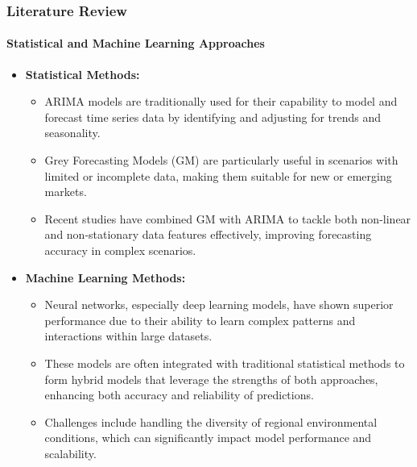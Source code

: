 \documentclass[light]{lutbeamer} %
\begin{document}
\begin{frame}
    \frametitle{Literature Review}
    \framesubtitle{Statistical and Machine Learning Approaches}
    \begin{itemize}
        \item \textbf{Statistical Methods:}
              \begin{itemize}
                  \item ARIMA models are traditionally used for their capability to model and forecast time series data by identifying and adjusting for trends and seasonality.
                  \item Grey Forecasting Models (GM) are particularly useful in scenarios with limited or incomplete data, making them suitable for new or emerging markets.
                  \item Recent studies have combined GM with ARIMA to tackle both non-linear and non-stationary data features effectively, improving forecasting accuracy in complex scenarios.
              \end{itemize}
        \item \textbf{Machine Learning Methods:}
              \begin{itemize}
                  \item Neural networks, especially deep learning models, have shown superior performance due to their ability to learn complex patterns and interactions within large datasets.
                  \item These models are often integrated with traditional statistical methods to form hybrid models that leverage the strengths of both approaches, enhancing both accuracy and reliability of predictions.
                  \item Challenges include handling the diversity of regional environmental conditions, which can significantly impact model performance and scalability.
              \end{itemize}
    \end{itemize}
\end{frame}
\end{document}
